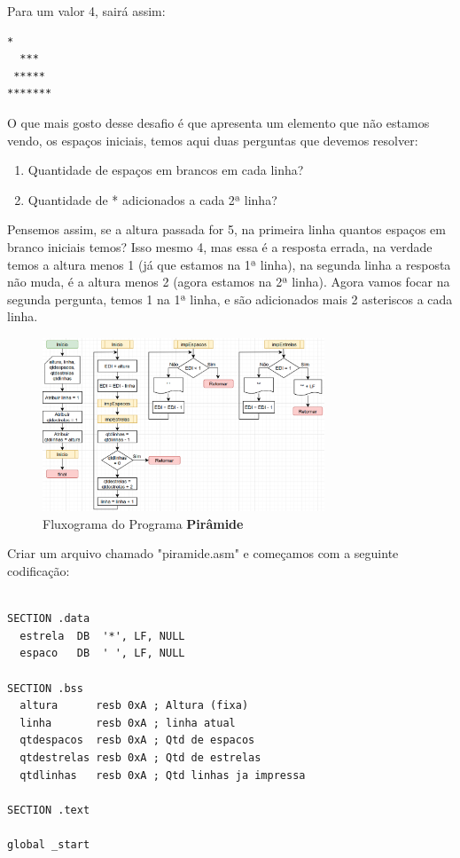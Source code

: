 Para um valor 4, sairá assim:
\begin{lstlisting}[]
   *
  ***
 *****
*******
\end{lstlisting}

O que mais gosto desse desafio é que apresenta um elemento que não estamos vendo, os espaços iniciais, temos aqui duas perguntas que devemos resolver:
\begin{enumerate}[nolistsep]
	\item Quantidade de espaços em brancos em cada linha?
	\item Quantidade de * adicionados a cada 2ª linha?
\end{enumerate}

Pensemos assim, se a altura passada for 5, na primeira linha quantos espaços em branco iniciais temos? Isso mesmo 4, mas essa é a resposta errada, na verdade temos a altura menos 1 (já que estamos na 1ª linha), na segunda linha a resposta não muda, é a altura menos 2 (agora estamos na 2ª linha). Agora vamos focar na segunda pergunta, temos 1 na 1ª linha, e são adicionados mais 2 asteriscos a cada linha.

\begin{figure}[H]
	\centering
	\includegraphics[width=0.75\textwidth]{Pictures/cap03/programa32}
	\caption{Fluxograma do Programa \textbf{Pirâmide}}
\end{figure}

Criar um arquivo chamado "piramide.asm" e começamos com a seguinte codificação:
\begin{lstlisting}[]
%include 'bibliotecaE.inc'

SECTION .data
  estrela  DB  '*', LF, NULL
  espaco   DB  ' ', LF, NULL

SECTION .bss
  altura      resb 0xA ; Altura (fixa)
  linha       resb 0xA ; linha atual
  qtdespacos  resb 0xA ; Qtd de espacos
  qtdestrelas resb 0xA ; Qtd de estrelas
  qtdlinhas   resb 0xA ; Qtd linhas ja impressa

SECTION .text

global _start
\end{lstlisting}

